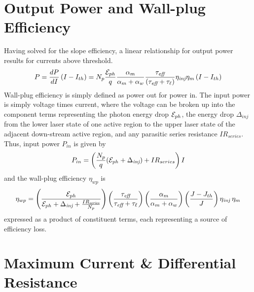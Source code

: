 {\section{Output Power and Wall-plug Efficiency}
Having solved for the slope efficiency, a linear relationship for output power results for currents above threshold.
\begin{equation}
P=\frac{d P}{dI} \left( I - I_{th} \right) = N_p \frac{\EE_{ph}}{q} \frac{\alpha_m}{\alpha_m+\alpha_w}   \frac{\tau_\textit{eff}}{\left(\tau_\textit{eff}+\tau_{\ell}\right)} \eta_\textit{inj} \eta_{m}  \left( I - I_{th} \right)
\end{equation}
Wall-plug efficiency is simply defined as power out for power in.  The input power is simply voltage times current, where the voltage can be broken up into the component terms representing the photon energy drop $\EE_{ph}$, the energy drop $\Delta_\textit{inj}$ from the lower laser state of one active region to the upper laser state of the adjacent down-stream active region, and any parasitic series resistance $I R_{series}$.  Thus, input power $P_{in}$ is given by
\begin{equation}
P_{in} = \left( \frac{N_p}{q} (\EE_{ph}+\Delta_\textit{inj})+ I R_{series} \right) I
\end{equation}
and the wall-plug efficiency $\eta_{wp}$ is
\begin{equation}
\eta_{wp}=
\Biggl( \frac{\EE_{ph}}{\EE_{ph}+\Delta_\textit{inj}+\frac{I R_\textit{series}}{N_p}} \Biggr)
\left(\frac{\tau_\textit{eff}}{\tau_\textit{eff}+\tau_\ell} \right)
\left(\frac{\alpha_m}{\alpha_m + \alpha_w} \right)
\left(\frac{J-J_{th}}{J}  \right)
\eta_\textit{inj} \: \eta_m
\end{equation}
expressed as a product of constituent terms, each representing a source of efficiency loss.


\section{Maximum Current \& Differential Resistance}

}
